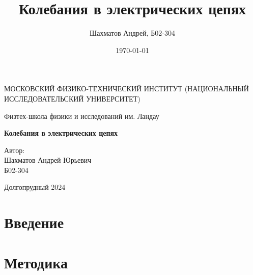 \documentclass[12pt]{article}
\title{Колебания в электрических цепях}
\author{Шахматов Андрей, Б02-304}
\date{\today}
\begin{document}
\begin{titlepage}
	\begin{center}
		{\large МОСКОВСКИЙ ФИЗИКО-ТЕХНИЧЕСКИЙ ИНСТИТУТ (НАЦИОНАЛЬНЫЙ ИССЛЕДОВАТЕЛЬСКИЙ УНИВЕРСИТЕТ)}
	\end{center}
	\begin{center}
		{\large Физтех-школа физики и исследований им. Ландау}
	\end{center}

	\vspace{3cm}
	{\huge
		\begin{center}
			\textbf{Колебания в электрических цепях}
		\end{center}
	}
	\vspace{2cm}
	\begin{flushright}
		{\LARGE Автор:\\ Шахматов Андрей Юрьевич \\
			\vspace{0.2cm}
			Б02-304}
	\end{flushright}
	\vspace{7 cm}
	\begin{center}
		Долгопрудный 2024
	\end{center}
	\thispagestyle{empty}
\end{titlepage}


\begin{abstract}

\end{abstract}


\section*{Введение}

\section*{Методика}
\end{document}
